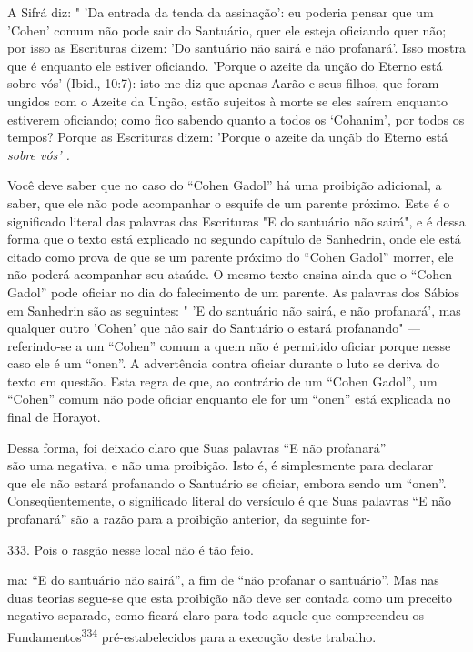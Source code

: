 A Sifrá diz: " 'Da entrada da tenda da assinação': eu poderia pensar que
um 'Cohen' comum não pode sair do Santuário, quer ele esteja oficiando
quer não; por isso as Escrituras dizem: 'Do santuário não sairá e não
profanará'. Isso mostra que é enquanto ele estiver oficiando. 'Porque o
azeite da unção do Eterno está sobre vós' (Ibid., 10:7): isto me diz que
apenas Aarão e seus fi­lhos, que foram ungidos com o Azeite da Unção,
estão sujeitos à morte se eles saírem enquanto estiverem oficiando; como
fico sabendo quanto a todos os `Cohanim', por todos os tempos? Porque as
Escrituras dizem: 'Porque o azeite da unçãb do Eterno está \emph{sobre
vós' .}

Você deve saber que no caso do ``Cohen Gadol'' há uma proibição adicional,
a saber, que ele não pode acompanhar o esquife de um parente pró­ximo.
Este é o significado literal das palavras das Escrituras "E do santuário
não sairá", e é dessa forma que o texto está explicado no segundo
capítulo de Sa­nhedrin, onde ele está citado como prova de que se um
parente próximo do ``Cohen Gadol'' morrer, ele não poderá acompanhar seu
ataúde. O mesmo tex­to ensina ainda que o ``Cohen Gadol'' pode oficiar no
dia do falecimento de um parente. As palavras dos Sábios em Sanhedrin
são as seguintes: " 'E do san­tuário não sairá, e não profanará', mas
qualquer outro 'Cohen' que não sair do Santuário o estará profanando"
--- referindo-se a um ``Cohen'' comum a quem não é permitido oficiar
porque nesse caso ele é um ``onen''. A advertência con­tra oficiar durante
o luto se deriva do texto em questão. Esta regra de que, ao contrário de
um ``Cohen Gadol'', um ``Cohen'' comum não pode oficiar en­quanto ele for um
``onen'' está explicada no final de Horayot.


Dessa forma, foi deixado claro que Suas palavras ``E não profanará''\\
são uma negativa, e não uma proibição. Isto é, é simplesmente para
declarar\\
que ele não estará profanando o Santuário se oficiar, embora sendo um
``onen''.\\
Conseqüentemente, o significado literal do versículo é que Suas palavras
``E não profanará'' são a razão para a proibição anterior, da
seguinte for-


333. Pois o rasgão nesse local não é tão feio.

ma: ``E do santuário não sairá'', a fim de ``não profanar o santuário''. Mas
nas duas teorias segue-se que esta proibição não deve ser contada como
um precei­to negativo separado, como ficará claro para todo aquele que
compreendeu os Fundamentos\textsuperscript{334} pré-estabelecidos para a
execução deste trabalho.

